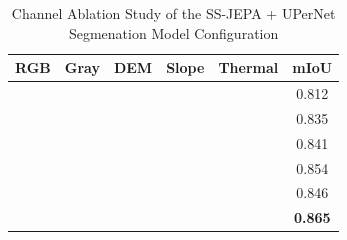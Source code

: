 \begin{table}
	\centering
	\begin{tabular}{cccccc}
		\toprule
		\textbf{RGB} & \textbf{Gray} & \textbf{DEM} & \textbf{Slope} & \textbf{Thermal} & \textbf{mIoU}  \\
		\midrule
		\checkmark   & \checkmark    &              &                &                  & 0.812          \\
		             &               & \checkmark   & \checkmark     &                  & 0.835          \\
		\checkmark   & \checkmark    & \checkmark   &                &                  & 0.841          \\
		\checkmark   & \checkmark    & \checkmark   & \checkmark     &                  & 0.854          \\
		             &               & \checkmark   & \checkmark     & \checkmark       & 0.846          \\
		\midrule
		\checkmark   & \checkmark    & \checkmark   & \checkmark     & \checkmark       & \textbf{0.865} \\
		\bottomrule
	\end{tabular}
	\vspace{1em}
	\caption{Channel Ablation Study of the SS-JEPA + UPerNet Segmenation Model Configuration}
	\vspace{-1em}
	\label{tab:channel_ablation}
\end{table}
